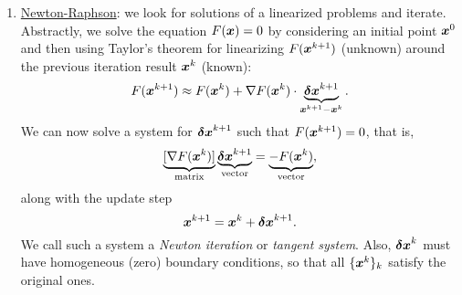 \documentclass{article}
\renewcommand{\vec}{\vectorsym}
\begin{document}
\begin{enumerate}
    \item \underline{Newton-Raphson}: we look for solutions of a linearized problems and iterate. Abstractly, we solve the equation $F(\vec x)=0$ by considering an initial point $\vec x^0$ and then using Taylor's theorem for linearizing $F(\vec x^{k+1})$ (unknown) around the previous iteration result $\vec x^k$ (known):
    $$
    F(\vec x^{k+1}) \approx F(\vec x^k) + \nabla F(\vec x^k)\cdot \underbrace{\vec{\delta x}^{k+1}}_{\vec x^{k+1} - \vec{x}^k}.
    $$
    We can now solve a system for $\vec{\delta x}^{k+1}$ such that $F(\vec x^{k+1}) = 0$, that is,
    $$\underbrace{[\nabla F(\vec x^k)]}_{\text{matrix}} \underbrace{\vec{\delta x}^{k+1}}_{\text{vector}} = \underbrace{-F(\vec x^k)}_{\text{vector}},$$
    along with the update step
    $$\vec x^{k+1} = \vec{x}^k + \vec{\delta x}^{k+1}.$$
    We call such a system a \textit{Newton iteration} or \textit{tangent system}. Also, $\vec{\delta x}^{k}$ must have homogeneous (zero) boundary conditions, so that all $\{\vec x^{k}\}_k$ satisfy the original ones. 
    

\end{enumerate}
\end{document}
